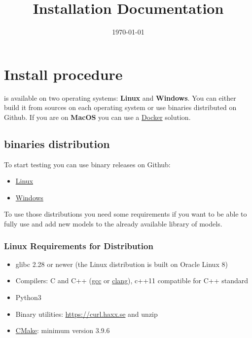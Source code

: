 \documentclass[a4paper, 12pt]{report}
\begin{document}
\title{\Dynawo Installation Documentation}
\date\today

\maketitle
\tableofcontents

\chapter{Install procedure}

\Dynawo is available on two operating systems: \textbf{Linux} and \textbf{Windows}.
You can either build it from sources on each operating system or use binaries distributed on Github.
If you are on \textbf{MacOS} you can use a \hyperref[sec:docker]{Docker} solution.

\section{\Dynawo binaries distribution}

To start testing \Dynawo you can use binary releases on Github:
\begin{itemize}
\item
  \href{https://github.com/dynawo/dynawo/releases/download/v1.8.0/Dynawo_Linux_v1.8.0.zip}{Linux}
\item
  \href{https://github.com/dynawo/dynawo/releases/download/v1.8.0/Dynawo_Windows_v1.8.0.zip}{Windows}
\end{itemize}

To use those distributions you need some requirements if you want to be able to fully use \Dynawo and add new models to the already available library of models.

\subsection{Linux Requirements for Distribution}

\begin{itemize}
\item glibc 2.28 or newer (the Linux distribution is built on Oracle Linux 8)
\item Compilers: C and C++ (\href{https://www.gnu.org/software/gcc}{gcc} or \href{https://clang.llvm.org}{clang}), c++11 compatible for C++ standard
\item Python3
\item Binary utilities: \href{curl}{https://curl.haxx.se} and unzip
\item \href{https://cmake.org/}{CMake}: minimum version 3.9.6
\end{itemize}
\end{document}
